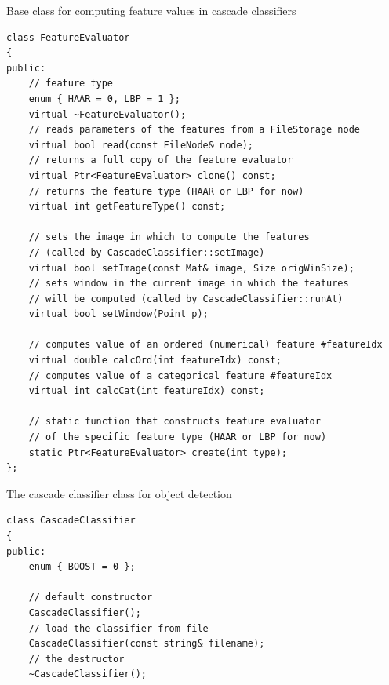 \begin{description}
\label{FeatureEvaluator}
Base class for computing feature values in cascade classifiers

\begin{lstlisting}
class FeatureEvaluator
{
public:    
    // feature type
    enum { HAAR = 0, LBP = 1 };
    virtual ~FeatureEvaluator();
    // reads parameters of the features from a FileStorage node
    virtual bool read(const FileNode& node);
    // returns a full copy of the feature evaluator
    virtual Ptr<FeatureEvaluator> clone() const;
    // returns the feature type (HAAR or LBP for now)
    virtual int getFeatureType() const;
    
    // sets the image in which to compute the features
    // (called by CascadeClassifier::setImage) 
    virtual bool setImage(const Mat& image, Size origWinSize);
    // sets window in the current image in which the features
    // will be computed (called by CascadeClassifier::runAt)
    virtual bool setWindow(Point p);

    // computes value of an ordered (numerical) feature #featureIdx
    virtual double calcOrd(int featureIdx) const;
    // computes value of a categorical feature #featureIdx
    virtual int calcCat(int featureIdx) const;

    // static function that constructs feature evaluator
    // of the specific feature type (HAAR or LBP for now)
    static Ptr<FeatureEvaluator> create(int type);
};
\end{lstlisting}

\label{CascadeClassifier}
The cascade classifier class for object detection

\begin{lstlisting}
class CascadeClassifier
{
public:    
    enum { BOOST = 0 };

    // default constructor
    CascadeClassifier();
    // load the classifier from file
    CascadeClassifier(const string& filename);
    // the destructor
    ~CascadeClassifier();
    

\end{lstlisting}
\end{description}
